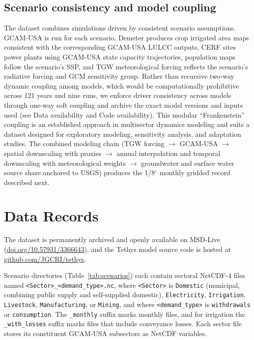 \documentclass[fleqn,10pt]{wlscirep}
\begin{document}
\subsection*{Scenario consistency and model coupling}

The dataset combines simulations driven by consistent scenario assumptions. GCAM-USA is run for each scenario, Demeter produces crop irrigated area maps consistent with the corresponding GCAM-USA LULCC outputs, CERF sites power plants using GCAM-USA state capacity trajectories, population maps follow the scenario's SSP, and TGW meteorological forcing reflects the scenario's radiative forcing and GCM sensitivity group. Rather than recursive two-way dynamic coupling among models, which would be computationally prohibitive across 121 years and nine runs, we enforce driver consistency across models through one-way soft coupling and archive the exact model versions and inputs used (see Data availability and Code availability). This modular ``Frankenstein'' coupling is an established approach in multisector dynamics modeling\cite{Khan2023, hess-17-4555-2013, hejazi2014, superwell, glory} and suits a dataset designed for exploratory modeling, sensitivity analysis, and adaptation studies. The combined modeling chain (TGW forcing $\to$ GCAM-USA $\to$ spatial downscaling with proxies $\to$ annual interpolation and temporal downscaling with meteorological weights $\to$ groundwater and surface water source share anchored to USGS) produces the 1/8$^{\circ}$ monthly gridded record described next.

\section*{Data Records}

The dataset is permanently archived and openly available on MSD-Live\cite{bracken2026TethysDataSet} (\href{https://doi.org/10.57931/3366643}{doi.org/10.57931/3366643}), and the Tethys model\cite{niazi_2026_20552731} source code is hosted at \href{https://github.com/JGCRI/tethys}{github.com/JGCRI/tethys}.

\begin{sloppypar}
Scenario directories (Table~\ref{tab:scenarios}) each contain sectoral NetCDF-4 files named \texttt{<Sector>\_\allowbreak<demand\_\allowbreak type>\allowbreak[\_monthly].nc}, where \texttt{<Sector>} is \texttt{Domestic} (municipal, combining public supply and self-supplied domestic), \texttt{Electricity}, \texttt{Irrigation}, \texttt{Livestock}, \texttt{Manufacturing}, or \texttt{Mining}, and where \texttt{<demand\_\allowbreak type>} is \texttt{withdrawals} or \texttt{consumption}. The \texttt{\_monthly} suffix marks monthly files, and for irrigation the \texttt{\_with\_losses} suffix marks files that include conveyance losses. Each sector file stores its constituent GCAM-USA subsectors as NetCDF variables.
\end{sloppypar}
\end{document}
